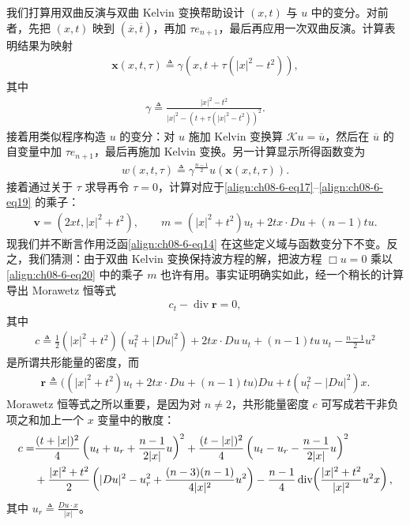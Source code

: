 \documentclass[../../main.tex]{subfiles}
\begin{document}
\begin{example}[波方程的共形能量]
我们打算用双曲反演与双曲 Kelvin 变换帮助设计 $(x,t)$ 与 $u$ 中的变分。对前者，先把 $(x,t)$ 映到 $(\overline{x},\overline{t})$，再加 $\tau e_{n+1}$，最后再应用一次双曲反演。计算表明结果为映射
\begin{align}
\mathbf{x}(x,t,\tau)\triangleq\gamma(x,t+\tau(|x|^2-t^2)),\label{align:ch08-6-eq17}
\end{align}
其中
\begin{align}
\gamma\triangleq\frac{|x|^2-t^2}{|x|^2-(t+\tau(|x|^2-t^2))^2}.\label{align:ch08-6-eq18}
\end{align}
接着用类似程序构造 $u$ 的变分：对 $u$ 施加 Kelvin 变换算 $\mathcal{K}u=\overline{u}$，然后在 $\overline{u}$ 的自变量中加 $\tau e_{n+1}$，最后再施加 Kelvin 变换。另一计算显示所得函数变为
\begin{align}
w(x,t,\tau)\triangleq\gamma^{\frac{n-1}{2}}u(\mathbf{x}(x,t,\tau)).\label{align:ch08-6-eq19}
\end{align}
接着通过关于 $\tau$ 求导再令 $\tau=0$，计算对应于\eqref{align:ch08-6-eq17}--\eqref{align:ch08-6-eq19} 的乘子：
\begin{align}
\mathbf{v}=(2xt,|x|^2+t^2),\qquad m=(|x|^2+t^2)u_t+2tx\cdot Du+(n-1)tu.\label{align:ch08-6-eq20}
\end{align}
现我们并不断言作用泛函\eqref{align:ch08-6-eq14} 在这些定义域与函数变分下不变。反之，我们猜测：由于双曲 Kelvin 变换保持波方程的解，把波方程 $\Box u=0$ 乘以\eqref{align:ch08-6-eq20} 中的乘子 $m$ 也许有用。事实证明确实如此，经一个稍长的计算导出 Morawetz 恒等式
\begin{align}
c_t-\operatorname{div}\mathbf{r}=0,\label{align:ch08-6-eq21}
\end{align}
其中
\begin{align}
c\triangleq\frac12(|x|^2+t^2)(u_t^2+|Du|^2)+2tx\cdot Du\,u_t+(n-1)tu\,u_t-\frac{n-1}{2}u^2\label{align:ch08-6-eq22}
\end{align}
是所谓共形能量的密度，而
\begin{align}
\mathbf{r}\triangleq\big((|x|^2+t^2)u_t+2tx\cdot Du+(n-1)tu\big)Du+t(u_t^2-|Du|^2)x.\label{align:ch08-6-eq23}
\end{align}
Morawetz 恒等式之所以重要，是因为对 $n\neq 2$，共形能量密度 $c$ 可写成若干非负项之和加上一个 $x$ 变量中的散度：
\begin{align}
c=&\frac{(t+|x|)^2}{4}\left(u_t+u_r+\frac{n-1}{2|x|}u\right)^2+\frac{(t-|x|)^2}{4}\left(u_t-u_r-\frac{n-1}{2|x|}u\right)^2\notag\\
&+\frac{|x|^2+t^2}{2}\left(|Du|^2-u_r^2+\frac{(n-3)(n-1)}{4|x|^2}u^2\right)-\frac{n-1}{4}\operatorname{div}\!\left(\frac{|x|^2+t^2}{|x|^2}u^2x\right),\label{align:ch08-6-eq24}
\end{align}
其中 $u_r\triangleq\frac{Du\cdot x}{|x|}$。
\end{example}
\end{document}

